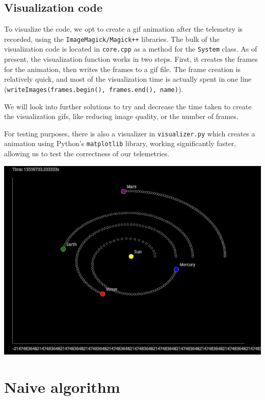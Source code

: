\documentclass{article}
\begin{document}
\subsection{Visualization code}

To visualize the code, we opt to create a gif animation after the telemetry is recorded, using the \texttt{ImageMagick/Magick++} libraries. The bulk of the visualization code is located in \texttt{core.cpp} as a method for the \texttt{System} class. As of present, the visualization function works in two steps. First, it creates the frames for the animation, then writes the frames to a gif file. The frame creation is relatively quick, and most of the visualization time is actually spent in one line (\texttt{writeImages(frames.begin(), frames.end(), name)}). 

We will look into further solutions to try and decrease the time taken to create the visualization gifs, like reducing image quality, or the number of frames. 

For testing purposes, there is also a visualizer in \texttt{visualizer.py} which creates a animation using Python's \texttt{matplotlib} library, working significantly faster, allowing us to test the correctness of our telemetries.

\begin{center}
    \includegraphics[scale=0.5]{teX/screenshot.jpg}
\end{center}

\section{Naive algorithm}
\end{document}
